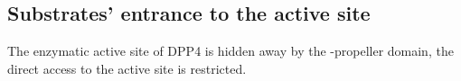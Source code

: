 \subsection{Substrates' entrance to the active site}

The enzymatic active site of DPP4 is hidden away by the \beta-propeller domain, the direct access to the active site is restricted. 
